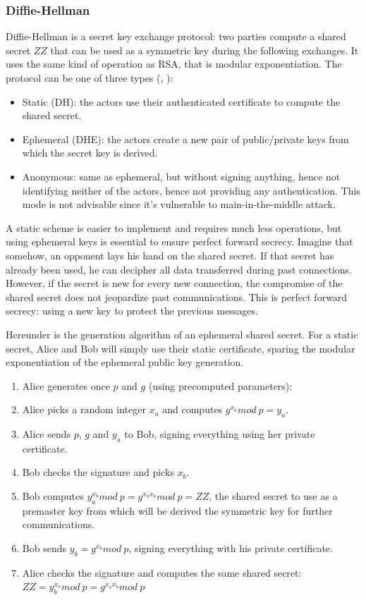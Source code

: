 \subsubsection{Diffie-Hellman}
Diffie-Hellman is a secret key exchange protocol: two parties compute a shared secret $ZZ$ that can be used as a symmetric key during the following exchanges.
It uses the same kind of operation as RSA, that is modular exponentiation.
The protocol can be one of three types (\cite{rfc2631}, \cite{Frankel:2005:SGI:2206289}):
\begin{itemize}
	\item Static (DH): the actors use their authenticated certificate to compute the shared secret.
	\item Ephemeral (DHE): the actors create a new pair of public/private keys from which the secret key is derived.
	\item Anonymous: same as ephemeral, but without signing anything, hence not identifying neither of the actors, hence not providing any authentication. This mode is not advisable since it's vulnerable to main-in-the-middle attack.
\end{itemize}
A static scheme is easier to implement and requires much less operations, but using ephemeral keys is essential to ensure perfect forward secrecy.
Imagine that somehow, an opponent lays his hand on the shared secret.
If that secret has already been used, he can decipher all data transferred during past connections.
However, if the secret is new for every new connection, the compromise of the shared secret does not jeopardize past communications.
This is perfect forward secrecy: using a new key to protect the previous messages.

Hereunder is the generation algorithm of an ephemeral shared secret.
For a static secret, Alice and Bob will simply use their static certificate, sparing the modular exponentiation of the ephemeral public key generation.
\begin{enumerate}
	\item Alice generates once $p$ and $g$ (using precomputed parameters):
	\begin{description}[nosep]
		\item[p] large prime number
		\item[g] a generator of $\mathds{Z}_p^*$
	\end{description}
	\item Alice picks a random integer $x_a$ and computes $g^{x_a} mod\ p = y_a$.
	\item Alice sends $p$, $g$ and $y_a$ to Bob, signing everything using her private certificate.
	\item Bob checks the signature and picks $x_b$.
	\item Bob computes $y_a^{x_b} mod\ p = g^{x_a x_b} mod\ p = ZZ$, the shared secret to use as a premaster key from which will be derived the symmetric key for further communications.
	\item Bob sends $y_b = g^{x_b} mod\ p$, signing everything with his private certificate.
	\item Alice checks the signature and computes the same shared secret: $ZZ = y_b^{x_a} mod\ p = g^{x_a x_b} mod\ p$
\end{enumerate}

